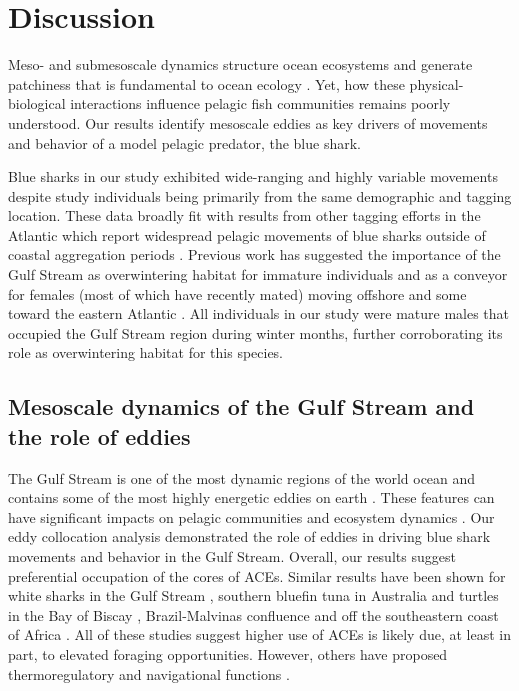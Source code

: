 \section{Discussion}

Meso- and submesoscale dynamics structure ocean ecosystems and generate patchiness that is fundamental to ocean ecology \citep{McGillicuddy2016, Mahadevan2016}. Yet, how these physical-biological interactions influence pelagic fish communities remains poorly understood. Our results identify mesoscale eddies as key drivers of movements and behavior of a model pelagic predator, the blue shark.

Blue sharks in our study exhibited wide-ranging and highly variable movements despite study individuals being primarily from the same demographic and tagging location. These data broadly fit with results from other tagging efforts in the Atlantic which report widespread pelagic movements of blue sharks outside of coastal aggregation periods \citep{Vandeperre2014, Campana2011, Howey2017}. Previous work has suggested the importance of the Gulf Stream as overwintering habitat for immature individuals \citep{Campana2011} and as a conveyor for females (most of which have recently mated) moving offshore and some toward the eastern Atlantic \citep[reviewed in][]{Nakano2008}. All individuals in our study were mature males that occupied the Gulf Stream region during winter months, further corroborating its role as overwintering habitat for this species.

\subsection{Mesoscale dynamics of the Gulf Stream and the role of eddies}

The Gulf Stream is one of the most dynamic regions of the world ocean and contains some of the most highly energetic eddies on earth \citep{Chelton2011}. These features can have significant impacts on pelagic communities \citep{Gaube2017DSR} and ecosystem dynamics \citep{Davis1985, Boyd1986, Gaube2018}. Our eddy collocation analysis demonstrated the role of eddies in driving blue shark movements and behavior in the Gulf Stream. Overall, our results suggest preferential occupation of the cores of ACEs. Similar results have been shown for white sharks in the Gulf Stream \citep{Gaube2018}, southern bluefin tuna in Australia \citep{Hobday2014} and turtles in the Bay of Biscay \citep{Doyle2008}, Brazil-Malvinas confluence \citep{Gaube2017} and off the southeastern coast of Africa \citep{Luschi2003}. All of these studies suggest higher use of ACEs is likely due, at least in part, to elevated foraging opportunities. However, others have proposed thermoregulatory \citep{Campana2011, Gaube2018, Gaube2017} and navigational functions \citep{Carey1990}.

